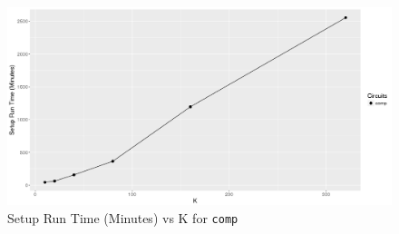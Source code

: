 \documentclass[12pt,twoside]{reedthesis}
\begin{document}
  \begin{figure}[htbp]
	   
	       \centering
	   \includegraphics[scale = .46]{SRTvK}
	     \caption{Setup Run Time (Minutes) vs K for \texttt{comp}}
	 \label{subd}
	\end{figure}
 
  
 
\end{document}
